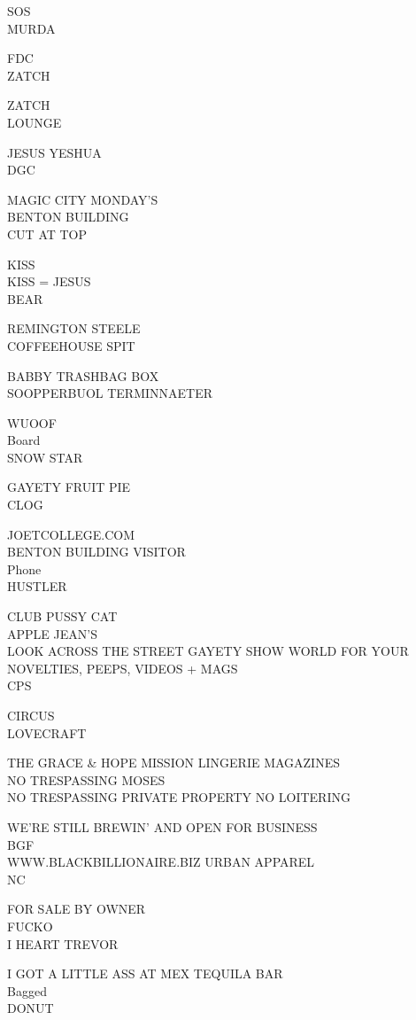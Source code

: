 \documentclass[10pt,letterpaper]{article}
\begin{document}
SOS\\
MURDA

FDC\\
ZATCH

ZATCH\\
LOUNGE

JESUS YESHUA\\
DGC

MAGIC CITY MONDAY'S\\
BENTON BUILDING\\
CUT AT TOP

KISS\\
KISS = JESUS\\
BEAR

REMINGTON STEELE\\
COFFEEHOUSE SPIT

BABBY TRASHBAG BOX\\
SOOPPERBUOL TERMINNAETER

WUOOF\\
Board\\
SNOW STAR

GAYETY FRUIT PIE\\
CLOG

JOETCOLLEGE.COM\\
BENTON BUILDING VISITOR\\
Phone\\
HUSTLER

CLUB PUSSY CAT\\
APPLE JEAN'S\\
LOOK ACROSS THE STREET GAYETY SHOW WORLD FOR YOUR NOVELTIES, PEEPS, VIDEOS + MAGS\\
CPS

CIRCUS\\
LOVECRAFT

THE GRACE \& HOPE MISSION LINGERIE MAGAZINES\\
NO TRESPASSING MOSES\\
NO TRESPASSING PRIVATE PROPERTY NO LOITERING

WE'RE STILL BREWIN' AND OPEN FOR BUSINESS\\
BGF\\
WWW.BLACKBILLIONAIRE.BIZ URBAN APPAREL\\
NC

FOR SALE BY OWNER\\
FUCKO\\
I HEART TREVOR

I GOT A LITTLE ASS AT MEX TEQUILA BAR\\
Bagged\\
DONUT
\end{document}
